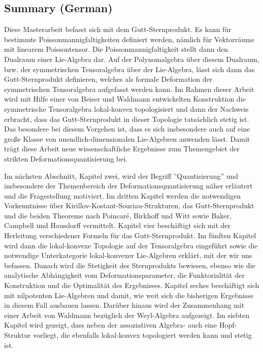 \subsection*{Summary (German)}

Diese Masterarbeit befasst sich mit dem Gutt-Sternprodukt. Es kann f\"ur bestimmte 
Poissonmannigfaltigkeiten definiert werden, n\"amlich f\"ur Vektorr\"aume mit 
linearem Poissontensor. Die Poissonmannigfaltigkeit stellt dann den Dualraum einer 
Lie-Algebra dar. Auf der Polynomalgebra \"uber diesem Dualraum, bzw. der 
symmetrischen Tensoralgebra \"uber der Lie-Algebra, l\"asst sich dann das 
Gutt-Sternprodukt definieren, welches als formale Deformation der symmetrischen 
Tensoralgebra aufgefasst werden kann. Im Rahmen dieser Arbeit wird mit Hilfe einer 
von Beiser und Waldmann entwickelten Konstruktion die symmetrische Tensoralgebra 
lokal-konvex topologisiert und dann der Nachweis erbracht, dass das 
Gutt-Sternprodukt in dieser Topologie tats\"achlich stetig ist. Das besondere bei 
diesem Vorgehen ist, dass es sich insbesondere auch auf eine große Klasse von 
unendlich-dimensionalen Lie-Algebren anwenden l\"asst. Damit tr\"agt diese Arbeit 
neue wissenschaftliche Ergebnisse zum Themengebiet der strikten 
Deformationsquantisierung bei.

Im nächsten Abschnitt, Kapitel zwei, wird der Begriff ''Quantisierung'' und 
insbesondere der Themenbereich der Deformationsquantisierung n\"aher erl\"autert 
und die Fragestellung motiviert. Im dritten Kapitel werden die notwendigen 
Vorkenntnisse \"uber Kirillov-Kostant-Souriau-Strukturen, das Gutt-Sternprodukt 
und die beiden Theoreme nach Poincar\'e, Birkhoff und Witt sowie Baker, Campbell 
und Hausdorff vermittelt. Kapitel vier besch\"aftigt sich mit der Herleitung 
verschiedener Formeln f\"ur das Gutt-Sternprodukt. Im f\"unften Kapitel wird dann 
die lokal-konvexe Topologie auf der Tensoralgebra eingef\"uhrt sowie die 
notwendige Unterkategorie lokal-konvexer Lie-Algebren erkl\"art, mit der wir uns 
befassen. Danach wird die Stetigkeit des Sternprodukts bewiesen, ebenso wie die 
analytische Abh\"angigkeit vom Deformationsparameter, die Funktorialit\"at der 
Konstruktion und die Optimalit\"at des Ergebnisses. Kapitel seches besch\"aftigt 
sich mit nilpotenten Lie-Algebren und damit, wie weit sich die bisherigen 
Ergebnisse in diesem Fall ausbauen lassen. Dar\"uber hinaus wird der Zusammenhang 
mit einer Arbeit von Waldmann bez\"uglich der Weyl-Algebra aufgezeigt. Im siebten 
Kapitel wird gezeigt, dass neben der assoziativen Algebra- auch eine Hopf-Struktur 
vorliegt, die ebenfalls lokal-konvex topologiert werden kann und stetig ist.




